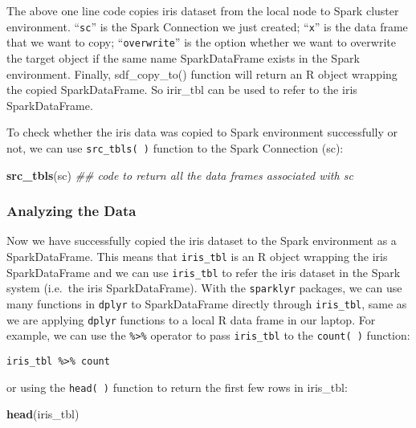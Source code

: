 \documentclass[
]{article}
\newenvironment{Shaded}{\begin{snugshade}}{\end{snugshade}}
\newcommand{\CommentTok}[1]{\textcolor[rgb]{0.56,0.35,0.01}{\textit{#1}}}
\newcommand{\KeywordTok}[1]{\textcolor[rgb]{0.13,0.29,0.53}{\textbf{#1}}}
\newcommand{\NormalTok}[1]{#1}
\begin{document}
The above one line code copies iris dataset from the local node to Spark
cluster environment. ``\texttt{sc}'' is the Spark Connection we just
created; ``\texttt{x}'' is the data frame that we want to copy;
``\texttt{overwrite}'' is the option whether we want to overwrite the
target object if the same name SparkDataFrame exists in the Spark
environment. Finally, sdf\_copy\_to() function will return an R object
wrapping the copied SparkDataFrame. So irir\_tbl can be used to refer to
the iris SparkDataFrame.

To check whether the iris data was copied to Spark environment
successfully or not, we can use \texttt{src\_tbls(\ )} function to the
Spark Connection (sc):

\begin{Shaded}
\begin{Highlighting}[]
\KeywordTok{src_tbls}\NormalTok{(sc) }\CommentTok{## code to return all the data frames associated with sc}
\end{Highlighting}
\end{Shaded}

\hypertarget{analyzing-the-data}{%
\subsubsection{Analyzing the Data}\label{analyzing-the-data}}

Now we have successfully copied the iris dataset to the Spark
environment as a SparkDataFrame. This means that \texttt{iris\_tbl} is
an R object wrapping the iris SparkDataFrame and we can use
\texttt{iris\_tbl} to refer the iris dataset in the Spark system
(i.e.~the iris SparkDataFrame). With the \texttt{sparklyr} packages, we
can use many functions in \texttt{dplyr} to SparkDataFrame directly
through \texttt{iris\_tbl}, same as we are applying \texttt{dplyr}
functions to a local R data frame in our laptop. For example, we can use
the \texttt{\%\textgreater{}\%} operator to pass \texttt{iris\_tbl} to
the \texttt{count(\ )} function:

\begin{verbatim}
iris_tbl %>% count
\end{verbatim}

or using the \texttt{head(\ )} function to return the first few rows in
iris\_tbl:

\begin{Shaded}
\begin{Highlighting}[]
\KeywordTok{head}\NormalTok{(iris_tbl)}
\end{Highlighting}
\end{Shaded}
\end{document}
